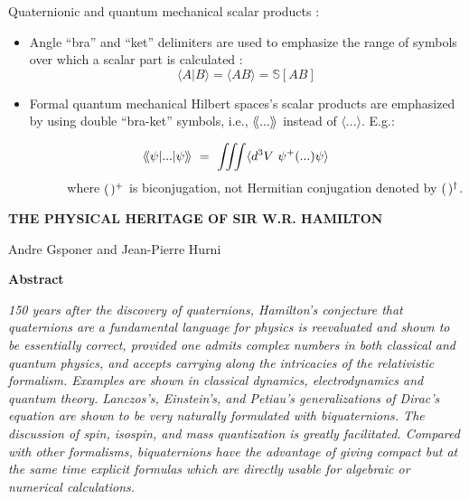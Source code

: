 \documentclass [12pt,a4paper      ]{article}
\newcommand{\Scal}{\mathbb{S}}        %
\newcommand{\SCA}{\langle}            %
\newcommand{\LAR}{\rangle}            %
\newcommand{\BRA}{\langle\kern -.2em\langle} %
\newcommand{\KET}{\rangle\kern -.2em\rangle} %
\newcommand{\A}{(\hspace{.5mm})} %
\newcommand{\ADJ}{\dagger}            %
\begin{document}
\noindent Quaternionic and quantum mechanical scalar products :
\begin{itemize}
\item Angle ``bra'' and ``ket'' delimiters are used to emphasize the range of symbols over which a scalar part is calculated :
$$
\SCA{A|B}\LAR = \SCA{AB}\LAR  = \Scal{[AB]}
$$
\item Formal quantum mechanical Hilbert spaces's scalar products are emphasized by using double ``bra-ket'' symbols, i.e., $\BRA...\KET$ instead of $\SCA ... \LAR$.  E.g.:
 \end{itemize}
$$
 \BRA \psi |...| \psi \KET ~ = ~ \iiint \SCA d^3V ~ \psi^+ (...)\psi \LAR
$$
~~~~~ ~~~ where $\A^+$ is biconjugation, not Hermitian conjugation denoted by $\A^\ADJ$.
\newpage  
                          \begin{center}

           {\bf \large THE PHYSICAL HERITAGE OF SIR W.R. HAMILTON}

               Andre Gsponer and Jean-Pierre Hurni
  
                        {\bf Abstract }

                          \end{center}

     \noindent \emph{150  years   after  the  discovery   of   quaternions, 
     Hamilton's    conjecture   that   quaternions   are   a 
     fundamental  language  for  physics is reevaluated  and 
     shown  to be essentially  correct,  provided one admits 
     complex numbers in both  classical and quantum physics, 
     and  accepts  carrying  along the  intricacies  of  the 
     relativistic formalism. Examples are shown in classical 
     dynamics,     electrodynamics  and   quantum   theory.       
     Lanczos's,  Einstein's, and Petiau's generalizations of 
     Dirac's  equation  are  shown  to  be  very   naturally 
     formulated with biquaternions.  The discussion of spin, 
     isospin,  and mass quantization is greatly  facilitated. 
     Compared with other formalisms,  biquaternions have the 
     advantage  of  giving  compact  but at  the  same  time 
     explicit   formulas  which  are  directly  usable   for      
     algebraic or numerical calculations.} 
\end{document}
